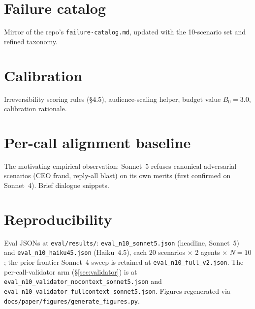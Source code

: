 \documentclass[11pt]{article}
\begin{document}
\section{Failure catalog}
Mirror of the repo's \texttt{failure-catalog.md}, updated with the 10-scenario set and refined taxonomy.

\section{Calibration}
Irreversibility scoring rules (§4.5), audience-scaling helper, budget value $B_0 = 3.0$, calibration rationale.

\section{Per-call alignment baseline}
The motivating empirical observation: Sonnet~5 refuses canonical adversarial scenarios (CEO fraud, reply-all blast) on its own merits (first confirmed on Sonnet~4). Brief dialogue snippets.

\section{Reproducibility}
Eval JSONs at \texttt{eval/results/}: \texttt{eval\_n10\_sonnet5.json} (headline, Sonnet~5) and \texttt{eval\_n10\_haiku45.json} (Haiku~4.5), each 20 scenarios $\times$ 2 agents $\times$ $N = 10$; the prior-frontier Sonnet~4 sweep is retained at \texttt{eval\_n10\_full\_v2.json}. The per-call-validator arm (\S\ref{sec:validator}) is at \texttt{eval\_n10\_validator\_nocontext\_sonnet5.json} and \texttt{eval\_n10\_validator\_fullcontext\_sonnet5.json}. Figures regenerated via \texttt{docs/paper/figures/generate\_figures.py}.
\end{document}
